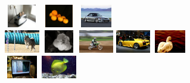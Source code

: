 \documentclass[10pt,twocolumn,letterpaper]{article}
\begin{document}
\begin{figure}[h]
\begin{center}
    \includegraphics[width=0.6in,height=0.4in]{./Figures/example_image/4_124_124475.jpg}
    \includegraphics[width=0.6in,height=0.4in]{./Figures/example_image/4_124_124483.jpg}
    \includegraphics[width=0.6in,height=0.4in]{./Figures/example_image/4_128_128511.jpg} \\
    \includegraphics[width=0.6in,height=0.4in]{./Figures/example_image/4_129_129409.jpg}
    \includegraphics[width=0.6in,height=0.4in]{./Figures/example_image/4_132_132238.jpg}
    \includegraphics[width=0.6in,height=0.4in]{./Figures/example_image/4_135_135774.jpg}
    \includegraphics[width=0.6in,height=0.4in]{./Figures/example_image/4_136_136057.jpg}
    \includegraphics[width=0.6in,height=0.4in]{./Figures/example_image/4_136_136687.jpg}\\
    \includegraphics[width=0.6in,height=0.4in]{./Figures/example_image/4_137_137444.jpg}
    \includegraphics[width=0.6in,height=0.4in]{./Figures/example_image/4_138_138371.jpg}

\end{center}
\end{figure}
\end{document}
